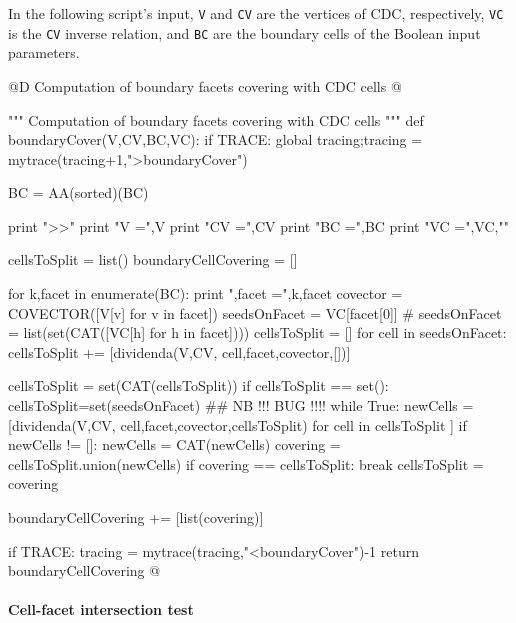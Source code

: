 \documentclass[11pt,oneside]{article}	%
\begin{document}
In the following script's input, \texttt{V} and  \texttt{CV} are the vertices of CDC, respectively, \texttt{VC} is the \texttt{CV} inverse relation, and \texttt{BC} are the boundary cells of the Boolean input parameters.



@D Computation of boundary facets covering with CDC cells
@{""" Computation of boundary facets covering with CDC cells """
def boundaryCover(V,CV,BC,VC):
	if TRACE: global tracing;tracing = mytrace(tracing+1,">boundaryCover")

	BC = AA(sorted)(BC)

	print "\nboundaryCover >>"
	print "V =",V
	print "CV =",CV
	print "BC =",BC
	print "VC =",VC,"\n"

	cellsToSplit = list()
	boundaryCellCovering = []

	for k,facet in enumerate(BC):
		print "\nk,facet =",k,facet
		covector = COVECTOR([V[v] for v in facet])
		seedsOnFacet = VC[facet[0]] 
		# seedsOnFacet = list(set(CAT([VC[h] for h in facet])))
		cellsToSplit = []
		for cell in seedsOnFacet:
			cellsToSplit += [dividenda(V,CV, cell,facet,covector,[])]
				
		cellsToSplit = set(CAT(cellsToSplit))		
		if cellsToSplit == set(): cellsToSplit=set(seedsOnFacet) ## NB !!!  BUG !!!!
		while True:
			newCells = [dividenda(V,CV, cell,facet,covector,cellsToSplit) 
							for cell in cellsToSplit ]
			if newCells != []: newCells = CAT(newCells)
			covering = cellsToSplit.union(newCells)
			if covering == cellsToSplit: 
				break
			cellsToSplit = covering
			
		boundaryCellCovering += [list(covering)]	

	if TRACE: tracing = mytrace(tracing,"<boundaryCover")-1
	return boundaryCellCovering
@}

\paragraph{Cell-facet intersection test}
\end{document}

